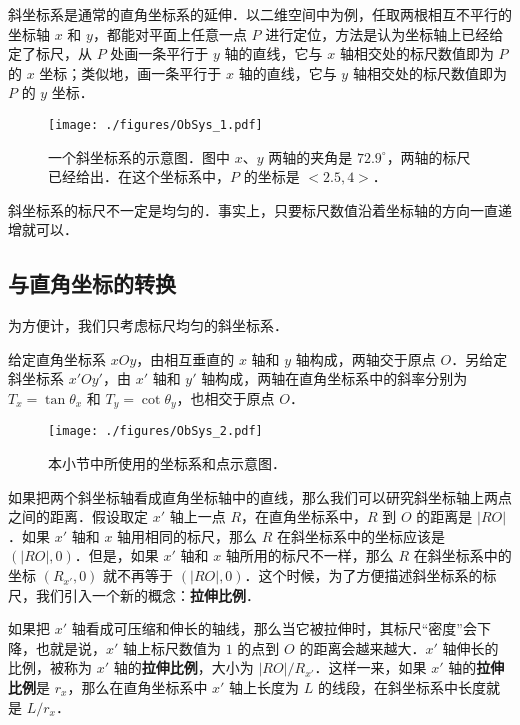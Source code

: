 

斜坐标系是通常的直角坐标系的延伸．以二维空间中为例，任取两根相互不平行的坐标轴 $x$ 和 $y$，都能对平面上任意一点 $P$ 进行定位，方法是认为坐标轴上已经给定了标尺，从 $P$ 处画一条平行于 $y$ 轴的直线，它与 $x$ 轴相交处的标尺数值即为 $P$ 的 $x$ 坐标；类似地，画一条平行于 $x$ 轴的直线，它与 $y$ 轴相交处的标尺数值即为 $P$ 的 $y$ 坐标．

\begin{figure}[ht]
\centering
\texttt{[image: ./figures/ObSys\_1.pdf]}
\caption{一个斜坐标系的示意图．图中 $x$、$y$ 两轴的夹角是 $72.9^\circ$，两轴的标尺已经给出．在这个坐标系中，$P$ 的坐标是 $<2.5, 4>$．} \label{ObSys_fig1}
\end{figure}

斜坐标系的标尺不一定是均匀的．事实上，只要标尺数值沿着坐标轴的方向一直递增就可以．

\subsection{与直角坐标的转换}

为方便计，我们只考虑标尺均匀的斜坐标系．

给定直角坐标系 $xOy$，由相互垂直的 $x$ 轴和 $y$ 轴构成，两轴交于原点 $O$．另给定斜坐标系 $x'Oy'$，由 $x'$ 轴和 $y'$ 轴构成，两轴在直角坐标系中的斜率分别为 $T_x=\tan{\theta_x}$ 和 $T_y=\cot{\theta_y}$，也相交于原点 $O$．

\begin{figure}[ht]
\centering
\texttt{[image: ./figures/ObSys\_2.pdf]}
\caption{本小节中所使用的坐标系和点示意图．} \label{ObSys_fig2}
\end{figure}

如果把两个斜坐标轴看成直角坐标轴中的直线，那么我们可以研究斜坐标轴上两点之间的距离．假设取定 $x'$ 轴上一点 $R$，在直角坐标系中，$R$ 到 $O$ 的距离是 $|RO|$．如果 $x'$ 轴和 $x$ 轴用相同的标尺，那么 $R$ 在斜坐标系中的坐标应该是 $(|RO|, 0)$．但是，如果 $x'$ 轴和 $x$ 轴所用的标尺不一样，那么 $R$ 在斜坐标系中的坐标 $(R_{x'},0)$ 就不再等于 $(|RO|, 0)$．这个时候，为了方便描述斜坐标系的标尺，我们引入一个新的概念：\textbf{拉伸比例}．

如果把 $x'$ 轴看成可压缩和伸长的轴线，那么当它被拉伸时，其标尺“密度”会下降，也就是说，$x'$ 轴上标尺数值为 $1$ 的点到 $O$ 的距离会越来越大．$x'$ 轴伸长的比例，被称为 $x'$ 轴的\textbf{拉伸比例}，大小为 $|RO|/R_{x'}$．这样一来，如果 $x'$ 轴的\textbf{拉伸比例}是 $r_x$，那么在直角坐标系中 $x'$ 轴上长度为 $L$ 的线段，在斜坐标系中长度就是 $L/r_x$．

